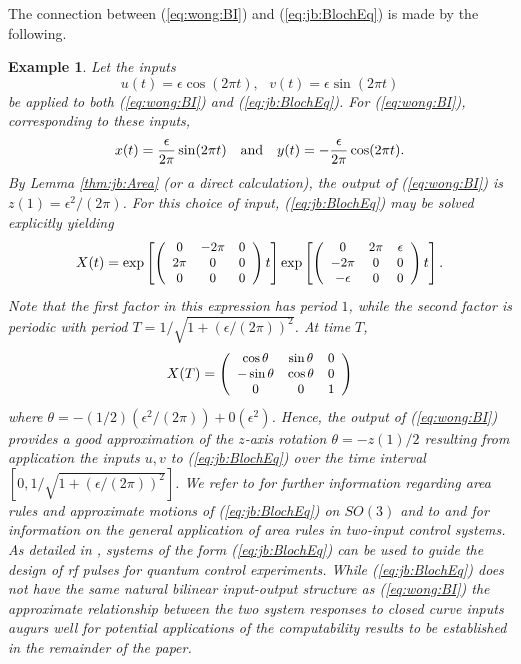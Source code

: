 \documentclass[12pt,onecolumn,draftcls]{IEEEtran}
\newtheorem{example}{Example}[section]
\begin{document}
The connection between (\ref{eq:wong:BI}) and (\ref{eq:jb:BlochEq}) is made by the following.
\medskip
\begin{example}\rm
Let the inputs
\[
u(t)=\epsilon\cos(2\pi t ), \ \ \ v(t) = \epsilon\sin(2\pi t)
\]
be applied to both (\ref{eq:wong:BI}) and (\ref{eq:jb:BlochEq}).  For (\ref{eq:wong:BI}), corresponding to these inputs,
\[
x(t)=\frac{\epsilon}{2\pi}\sin(2\pi t)\ \ \ {\rm and}\ \ \ y(t)=-\frac{\epsilon}{2\pi}\cos(2\pi t).
\]
By Lemma \ref{thm:jb:Area} (or a direct calculation), the output of (\ref{eq:wong:BI}) is $z(1)=\epsilon^2/(2\pi)$.  For this choice of input, (\ref{eq:jb:BlochEq}) may be solved explicitly yielding
\[
\small
X(t)=\exp\left[\left(\begin{array}{ccc}
0&-2\pi &0\\
2\pi & 0 & 0\\
0&0&0\end{array}
\right)t\right]\exp\left[\left(\begin{array}{ccc}
0&2\pi &\epsilon\\
-2\pi & 0 & 0\\
-\epsilon&0&0\end{array}
\right)t\right].
\]
Note that the first factor in this expression has period $1$, while the second factor is periodic with period $T=1/\sqrt{1+(\epsilon/(2\pi))^2}$.  At time $T$,
\[
\small
X(T)=\left(\begin{array}{ccc}
\cos\theta & \sin\theta & 0\\
-\sin\theta & \cos\theta & 0\\
0 & 0 & 1\end{array}
\right)
\]
where $\theta=-(1/2)(\epsilon^2/(2\pi))+0(\epsilon^2)$.  Hence, the output of (\ref{eq:wong:BI}) provides a good approximation of the $z$-axis rotation $\theta=-z(1)/2$ resulting from application the inputs $u,v$ to (\ref{eq:jb:BlochEq}) over the time interval $[0,1/\sqrt{1+(\epsilon/(2\pi))^2}]$.
We refer to \cite{WB} for further information regarding area rules and approximate motions of (\ref{eq:jb:BlochEq}) on $SO(3)$ and to \cite{LeonardKrishna} and  \cite{brockett2}
 for information on the general application of area rules in two-input control systems.  As detailed in \cite{JrShinLi}, systems of the form (\ref{eq:jb:BlochEq}) can be used to guide the design of rf pulses for quantum control experiments.  
While (\ref{eq:jb:BlochEq}) does not have the same natural bilinear input-output structure as (\ref{eq:wong:BI}) the approximate relationship between the two system responses to closed curve inputs augurs well for potential applications of the computability results to be established in the remainder of the paper.
\end{example}
\end{document}
